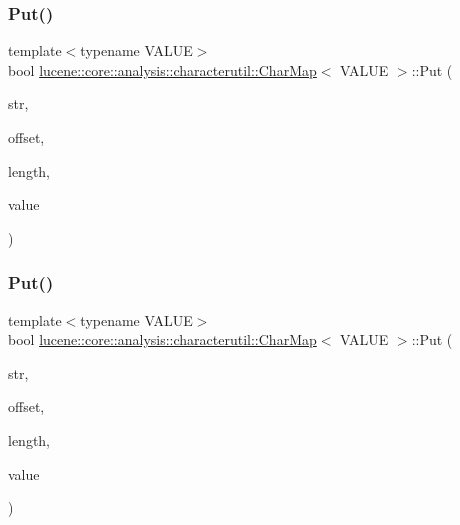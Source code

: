 \mbox{\label{classlucene_1_1core_1_1analysis_1_1characterutil_1_1CharMap_a09382e34715068e50efa4b40a34a4ee5}} 
\subsubsection{\texorpdfstring{Put()}{Put()}\hspace{0.1cm}{\footnotesize\ttfamily [1/4]}}
{\footnotesize\ttfamily template$<$typename V\+A\+L\+UE$>$ \\
bool \mbox{\hyperlink{classlucene_1_1core_1_1analysis_1_1characterutil_1_1CharMap}{lucene\+::core\+::analysis\+::characterutil\+::\+Char\+Map}}$<$ V\+A\+L\+UE $>$\+::Put (\begin{DoxyParamCaption}\item[{\mbox{\hyperlink{ZlibCrc32_8h_a2c212835823e3c54a8ab6d95c652660e}{const}} char $\ast$}]{str,  }\item[{uint32\+\_\+t}]{offset,  }\item[{uint32\+\_\+t}]{length,  }\item[{V\+A\+L\+UE \&}]{value }\end{DoxyParamCaption})\hspace{0.3cm}{\ttfamily [inline]}}

\mbox{\label{classlucene_1_1core_1_1analysis_1_1characterutil_1_1CharMap_a3d7b46fba00e762804ba1e953ac6587d}} 
\subsubsection{\texorpdfstring{Put()}{Put()}\hspace{0.1cm}{\footnotesize\ttfamily [2/4]}}
{\footnotesize\ttfamily template$<$typename V\+A\+L\+UE$>$ \\
bool \mbox{\hyperlink{classlucene_1_1core_1_1analysis_1_1characterutil_1_1CharMap}{lucene\+::core\+::analysis\+::characterutil\+::\+Char\+Map}}$<$ V\+A\+L\+UE $>$\+::Put (\begin{DoxyParamCaption}\item[{\mbox{\hyperlink{ZlibCrc32_8h_a2c212835823e3c54a8ab6d95c652660e}{const}} char $\ast$}]{str,  }\item[{uint32\+\_\+t}]{offset,  }\item[{uint32\+\_\+t}]{length,  }\item[{V\+A\+L\+UE \&\&}]{value }\end{DoxyParamCaption})\hspace{0.3cm}{\ttfamily [inline]}}

